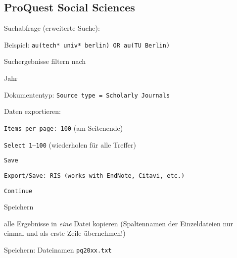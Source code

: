\subsection*{ProQuest Social Sciences}
\begin{compactitem}
\item Suchabfrage (erweiterte Suche):
	\begin{compactitem}
    \item Beispiel: \texttt{au(tech* univ* berlin) OR au(TU Berlin)}
    \end{compactitem}
\item Suchergebnisse filtern nach
	\begin{compactitem}
    \item Jahr
    \item Dokumententyp: \texttt{Source type = Scholarly Journals}
    \end{compactitem}
\item Daten exportieren: 
	\begin{compactitem}
    \item \texttt{Items per page: 100} (am Seitenende)
    \item \texttt{Select 1--100} (wiederholen für alle Treffer)
    \item \texttt{Save}
    \item \texttt{Export/Save: RIS (works with EndNote, Citavi, etc.)}
    \item \texttt{Continue}
    \item Speichern
	\end{compactitem}
\item alle Ergebnisse in \textit{eine} Datei kopieren (Spaltennamen der Einzeldateien nur einmal und als erste Zeile übernehmen!)
\item Speichern: Dateinamen \texttt{pq20xx.txt}
\end{compactitem}

